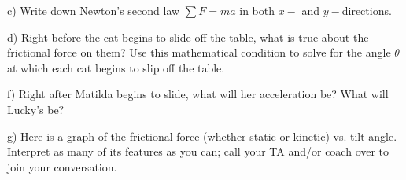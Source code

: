 \documentclass[12pt]{article}
\begin{document}
c) Write down Newton's second law $\sum F = ma$ in both $x-$ and $y-$directions. 

\vspace{2in}

d) Right before the cat begins to slide off the table, what is true about the frictional force on them? Use this 
mathematical condition to solve for the angle $\theta$ at which each cat begins to slip off the table.

\vspace{2in}

f) Right after Matilda begins to slide, what will her acceleration be? What will Lucky's be?

\vspace{3in}
\newpage

g) Here is a graph of the frictional force (whether static or kinetic) vs. tilt angle. Interpret as many of its features as you
can; call your TA and/or coach over to join your conversation.
\end{document}
